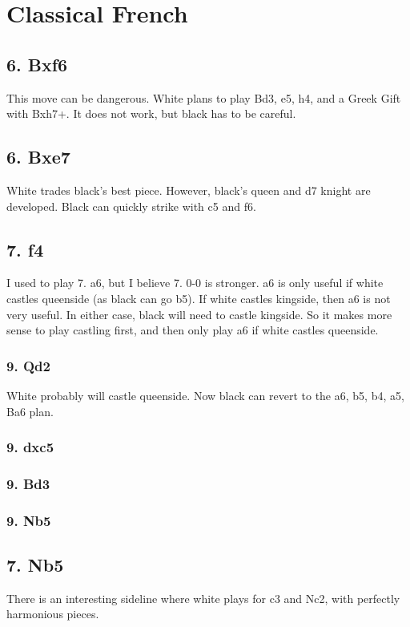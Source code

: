 \section{Classical French}

\subsection{6. Bxf6}

This move can be dangerous. White plans to play Bd3, e5, h4, and a Greek Gift with Bxh7+. It does not work, but black has to be careful.

\subsection{6. Bxe7}

White trades black's best piece. However, black's queen and d7 knight are developed. Black can quickly strike with c5 and f6. 

\subsection{7. f4}

I used to play 7. a6, but I believe 7. 0-0 is stronger. a6 is only useful if white castles queenside (as black can go b5).
If white castles kingside, then a6 is not very useful. In either case, black will need to castle kingside.
So it makes more sense to play castling first, and then only play a6 if white castles queenside.

\subsubsection{9. Qd2}

White probably will castle queenside. Now black can revert to the a6, b5, b4, a5, Ba6 plan.

\subsubsection{9. dxc5}

\subsubsection{9. Bd3}

\subsubsection{9. Nb5}

\subsection{7. Nb5}

There is an interesting sideline where white plays for c3 and Nc2, with perfectly harmonious pieces.